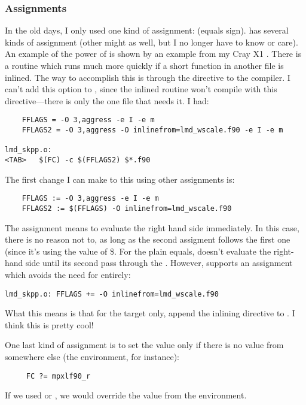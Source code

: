 \subsubsection{Assignments}

In the old days, I only used one kind of assignment: \code{=} (equals
sign).  has several kinds of assignment (other 
might as well, but I no longer have to know or care). An example of
the power of  is shown by an example from my Cray X1
.  There is a routine which runs much more quickly if a
short function in another file is inlined. The way to accomplish this is
through the  directive to the compiler. I can't
add this option to , since the inlined routine won't compile
with this directive---there is only the one file that needs it. I had:
\begin{verbatim}
    FFLAGS = -O 3,aggress -e I -e m
    FFLAGS2 = -O 3,aggress -O inlinefrom=lmd_wscale.f90 -e I -e m

lmd_skpp.o:
<TAB>   $(FC) -c $(FFLAGS2) $*.f90
\end{verbatim}
The first change I can make to this using other assignments is:
\begin{verbatim}
    FFLAGS := -O 3,aggress -e I -e m
    FFLAGS2 := $(FFLAGS) -O inlinefrom=lmd_wscale.f90
\end{verbatim}
The \code{:=} assignment means to evaluate the right hand side immediately.
In this case, there is no reason not to, as long as the second
assigment follows the first one (since it's using the value of
\$. For the plain equals,  doesn't evaluate the
right-hand side until its second pass through the . However,
supports an assignment which avoids the need for  entirely:
\begin{verbatim}
lmd_skpp.o: FFLAGS += -O inlinefrom=lmd_wscale.f90
\end{verbatim}
What this means is that for the target  only, append the
inlining directive to . I think this is pretty cool!

One last kind of assignment is to set the value only if there is no
value from somewhere else (the environment, for instance):
\begin{verbatim}
     FC ?= mpxlf90_r
\end{verbatim}
If we used \code{:=} or \code{=}, we would override the value from the
environment.

